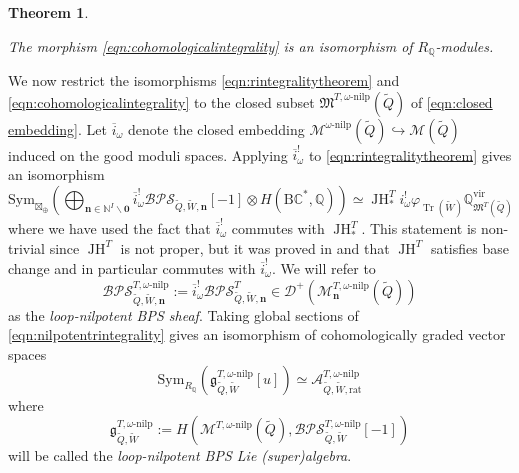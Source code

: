 \documentclass{amsart}
\newtheorem{theorem}{Theorem}[section]
\DeclareMathOperator{\Tr}{\mathrm{Tr}}
\def\vir{\mathrm{vir}}
\DeclareMathOperator{\JH}{\mathrm{JH}}
\def\oi{\overline{i}}
\def\CM{{\mathcal{M}}}
\def\Sym{\textrm{Sym}}
\def\nn{{\mathbb{N}^I}}
\def\bn{{\boldsymbol{n}}}
\def\b0{{\boldsymbol{0}}}
\def\Sym{\text{Sym}}
\def\tQ{\tilde{Q}}
\def\tW{\tilde{W}}
\def\kharat{\mathcal{A}^{T,\omega\text{-nilp}}_{\tQ,\tW,\text{rat}}}
\def\tbpsw{\mathfrak{g}^{T,\omega\text{-nilp}}_{\tilde{Q},\tilde{W}}}
\begin{document}
\medskip 

\begin{theorem} \label{thm:nilpotentintegrality}

The morphism \eqref{eqn:cohomologicalintegrality} is an isomorphism of $R_{\mathbb{Q}}$-modules. 

\end{theorem}

\medskip 

\noindent We now restrict the isomorphisms \eqref{eqn:rintegralitytheorem} and \eqref{eqn:cohomologicalintegrality} to the closed subset $\mathfrak{M}^{T,\omega\text{-nilp}}({\tilde{Q}})$ of \eqref{eqn:closed embedding}. Let $\overline{i}_{\omega}$ denote the closed embedding $\mathcal{M}^{\omega\text{-nilp}}(\tilde{Q}) \hookrightarrow \mathcal{M}(\tilde{Q})$ induced on the good moduli spaces. 
Applying $\overline{i}_{\omega}^{!}$ to \eqref{eqn:rintegralitytheorem} gives an isomorphism
\begin{equation} 
\label{eqn:nilpotentrintegrality}
\mathrm{Sym}_{\boxtimes_{\oplus}}\left(\bigoplus_{\bn \in \nn \backslash \b0} \overline{i}_{\omega}^!\mathcal{BPS}_{\tilde{Q},\tilde{W},\bn}[-1] \otimes H(\mathrm{B}\mathbb{C}^*,\mathbb{Q})\right) \simeq \JH^T_{*}i_{\omega}^!\varphi_{\Tr(\tilde{W})} \mathbb{Q}^{\vir}_{\mathfrak{M}^T(\tilde{Q})}
\end{equation}
where we have used the fact that $\overline{i}_{\omega}^!$ commutes with $\JH^T_{*}$. This statement is non-trivial since $\JH^T$ is not proper, but it was proved in \cite{davison2020cohomological} and \cite{kinjo2024decompositiontheoremgoodmoduli} that $\JH^T$ satisfies base change and in particular commutes with $\overline{i}_{\omega}^{!}$.  
We will refer to 
\[ 
\mathcal{BPS}^{T,\omega\text{-nilp}}_{\tilde{Q},\tilde{W},\bn}:= \oi_{\omega}^{!} \mathcal{BPS}^T_{\tilde{Q},\tilde{W},\bn} \in \mathcal{D}^+(\mathcal{M}^{T,\omega\text{-nilp}}_{\bn}(\tilde{Q})) 
\] 
as the \emph{loop-nilpotent BPS sheaf}. Taking global sections of \eqref{eqn:nilpotentrintegrality} gives an isomorphism of cohomologically graded vector spaces
\begin{equation} 
\label{eqn:nilpotentintegrality}
\Sym_{R_{\mathbb{Q}}}(\tbpsw[u]) \simeq \kharat
\end{equation} 
where 
\begin{equation} 
\label{eqn:loop-nilpotent bps}
\tbpsw := H(\CM^{T,\omega\text{-nilp}}(\tQ),\mathcal{BPS}^{T,\omega\text{-nilp}}_{\tilde{Q},\tilde{W}}[-1])
\end{equation}
will be called the \emph{loop-nilpotent BPS Lie (super)algebra}.
\end{document}
